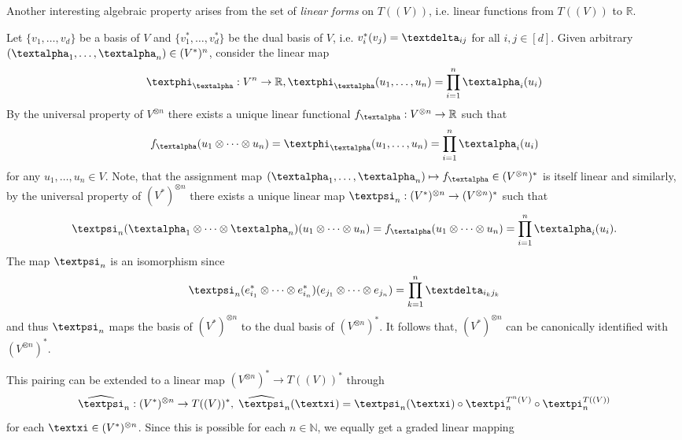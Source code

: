 \documentclass[openany]{book}
\begin{document}
Another interesting algebraic property arises from the set of \textit{linear forms} on $T((V))$, i.e. linear functions from $T((V))$ to $\mathbb R$.
\par Let $\{v_1,\dots,v_d\}$ be a basis of $V$ and $\{v_1^\ast,\dots,v_d^\ast\}$ be the dual basis of $V$, i.e. $ v_i^\ast(v_j)=\gdelta_{ij}$ for all $i,j\in [d]$. Given arbitrary $(\galpha_1, \dots,\galpha_n)\in (V^{\ast})^n$, consider the linear map
\begin{equation*}
    \gphi_{\galpha}:V^n \to \mathbb R, \gphi_{\galpha}(u_1,\dots,u_n)=\prod_{i=1}^n\galpha_i(u_i)
\end{equation*}
By the universal property of $V^{\otimes n}$ there exists a unique linear functional $f_{\galpha}:V^{\otimes n}\to \mathbb R$ such that
\begin{equation*}
    f_{\galpha}(u_1\otimes \cdots \otimes u_n)= \gphi_{\galpha}(u_1,\dots,u_n)=\prod_{i=1}^n\galpha_i(u_i)
\end{equation*}
for any $u_1,\dots, u_n\in V$. Note, that the assignment map $(\galpha_1,\dots,\galpha_n)\mapsto f_{\galpha}\in (V^{\otimes n})^\ast$ is itself linear and similarly, by the universal property of $(V^{\ast})^{\otimes n}$ there exists a unique linear map $\gpsi_{n}:(V^{\ast})^{\otimes n}\to (V^{\otimes n})^\ast$ such that 
\begin{equation*}
    \gpsi_{n}(\galpha_1\otimes \cdots \otimes \galpha_n)(u_1\otimes \cdots \otimes u_n)=f_{\galpha}(u_1\otimes \cdots \otimes u_n)=\prod_{i=1}^n\galpha_i(u_i).
\end{equation*}
The map $\gpsi_n$ is an isomorphism since 
\begin{equation*}
    \gpsi_n(e_{i_1}^\ast\otimes \cdots \otimes e_{i_n}^\ast)(e_{j_1}\otimes \cdots \otimes e_{j_n})=\prod_{k=1}^n\gdelta_{i_kj_k}
\end{equation*}
and thus $\gpsi_n$ maps the basis of $(V^\ast)^{\otimes n}$ to the dual basis of $(V^{\otimes n})^\ast$. It follows that, $(V^\ast)^{\otimes n}$ can be canonically identified with $(V^{\otimes n})^\ast$. 
\par This pairing can be extended to a linear map $(V^{\otimes n})^\ast \to T((V))^\ast$ through 
\begin{equation*}
    \widehat{\gpsi}_{n}:(V^{\ast})^{\otimes n} \to T((V))^\ast, \;\widehat{\gpsi}_n(\gxi)=\gpsi_n(\gxi)\circ \gpi_n^{T^n(V)}\circ \gpi_n^{T((V))}
\end{equation*}
for each $\gxi\in (V^{\ast})^{\otimes n}$. Since this is possible for each $n\in \mathbb N$, we equally get a graded linear mapping 
\end{document}
